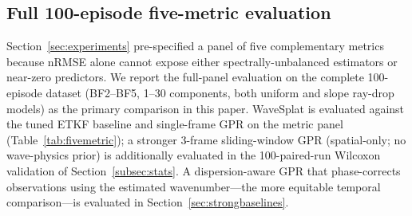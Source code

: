 %
%
%

\subsection{Full 100-episode five-metric evaluation}
\label{sec:fulleval}

Section~\ref{sec:experiments} pre-specified a panel of five
complementary metrics because nRMSE alone cannot expose either
spectrally-unbalanced estimators or near-zero predictors.  We report
the full-panel evaluation on the complete 100-episode dataset
(BF2--BF5, 1--30 components, both uniform and slope ray-drop models)
as the primary comparison in this paper.
WaveSplat is evaluated against the tuned ETKF baseline and
single-frame GPR on the metric panel (Table~\ref{tab:fivemetric}); a
stronger 3-frame sliding-window GPR (spatial-only; no wave-physics prior)
is additionally evaluated in the 100-paired-run Wilcoxon validation of
Section~\ref{subsec:stats}.  A dispersion-aware GPR that phase-corrects
observations using the estimated wavenumber---the more equitable temporal
comparison---is evaluated in Section~\ref{sec:strongbaselines}.

